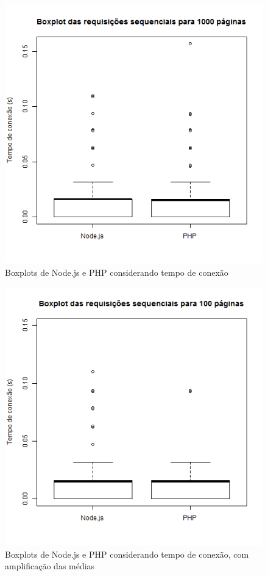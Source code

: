 \documentclass[conference,compsoc]{IEEEtran}
\begin{document}
\begin{figure}[h!]
\centering
  \includegraphics[scale=0.35]{plots/boxplots/sequential/CONNECT_TIME/boxplot_CONNECT_TIME_1000_pages.png}
  	\caption{Boxplots de Node.js e PHP considerando tempo de conexão}
	\label{fig:boxplot_connect_time_sequential_1000}
\end{figure}

\begin{figure}[h!]
\centering
  \includegraphics[scale=0.35]{plots/boxplots/sequential/CONNECT_TIME/boxplot_CONNECT_TIME_100_pages_zoom_mean.png}
  \caption{Boxplots de Node.js e PHP considerando tempo de conexão, com amplificação das médias}
  	\label{fig:boxplot_connect_time_sequential_100_zoom}
\end{figure}
\end{document}
